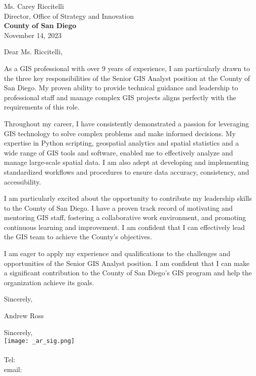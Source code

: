\documentclass[letterpaper]{article}
\begin{document}
\large
Ms. Carey Riccitelli \\
Director, Office of Strategy and Innovation \\
\textbf{County of San Diego} \\

\null\hfill November 14, 2023

Dear Ms. Riccitelli,

As a GIS professional with over 9 years of experience, I am
particularly drawn to the three key responsibilities of the Senior GIS Analyst
position at the County of San Diego. My proven ability to provide technical
guidance and leadership to professional staff and manage complex GIS projects aligns perfectly with the requirements of this
role.

Throughout my career, I have consistently demonstrated a passion for leveraging
GIS technology to solve complex problems and make informed decisions. My
expertise in Python scripting, geospatial analytics and spatial statistics and a wide
range of GIS tools and software, 
enabled me to effectively analyze and manage large-scale spatial data. I am
also adept at developing and implementing standardized workflows and procedures
to ensure data accuracy, consistency, and accessibility.

I am particularly excited about the opportunity to contribute my leadership
skills to the County of San Diego. I have a proven track record of motivating
and mentoring GIS staff, fostering a collaborative work environment, and
promoting continuous learning and improvement. I am confident that I can
effectively lead the GIS team to achieve the County's objectives.

I am eager to apply my experience and qualifications to the challenges and
opportunities of the Senior GIS Analyst position. I am confident that I can
make a significant contribution to the County of San Diego's GIS program and
help the organization achieve its goals.

Sincerely,


Andrew Ross

Sincerely,\\
    \hspace{1em}
    \texttt{[image: \_ar\_sig.png]} \\
    \CVsigname \\
    \small
    Tel: \CVphone \\
    email: \CVemail
\end{document}
